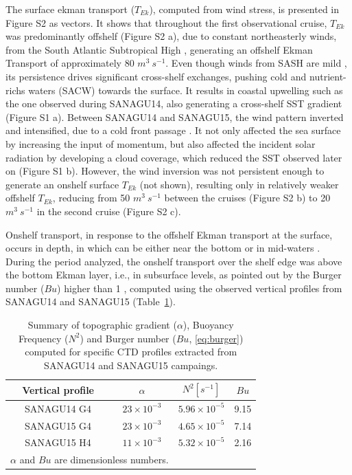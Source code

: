 \documentclass[draft]{agujournal2019}
\begin{document}
The surface ekman transport ($T_{Ek}$), computed from wind stress, is presented in Figure S2 as vectors. It shows that throughout the first observational cruise, $T_{Ek}$ was predominantly offshelf (Figure S2 a), due to constant northeasterly winds, from the South Atlantic Subtropical High \cite<SASH, >{stech1990estudo}, generating an offshelf Ekman Transport of approximately 80 $m^3\ s^{-1}$. Even though winds from SASH are mild \cite{stech1990estudo}, its persistence drives significant cross-shelf exchanges, pushing cold and nutrient-richs waters (SACW) towards the surface. It results in coastal upwelling such as the one observed during SANAGU14, also generating a cross-shelf SST gradient (Figure S1 a). Between SANAGU14 and SANAGU15, the wind pattern inverted and intensified, due to a cold front passage \cite{stech1990estudo}. It not only affected the sea surface by increasing the input of momentum, but also affected the incident solar radiation by developing a cloud coverage, which reduced the SST observed later on (Figure S1 b). However, the wind inversion was not persistent enough to generate an onshelf surface $T_{Ek}$ (not shown), resulting only in relatively weaker offshelf $T_{Ek}$, reducing from 50 $m^3\ s^{-1}$ between the cruises (Figure S2 b) to 20 $m^3\ s^{-1}$ in the second cruise (Figure S2 c).

Onshelf transport, in response to the offshelf Ekman transport at the surface, occurs in depth, in which can be either near the bottom or in mid-waters \cite{LentzChapman2004}. During the period analyzed, the onshelf transport over the shelf edge was above the bottom Ekman layer, i.e., in subsurface levels, as pointed out by the Burger number ($Bu$) higher than 1 \cite{LentzChapman2004}, computed using the observed vertical profiles from SANAGU14 and SANAGU15 (Table~\ref{tab:burger_number}).

\begin{table}[ht!]
\label{tab:burger_number}
\caption{Summary of topographic gradient ($\alpha$), Buoyancy Frequency ($N^2$) and Burger number ($Bu$, \ref{eq:burger}) computed for specific CTD profiles extracted from SANAGU14 and SANAGU15 campaings.}
\centering
\begin{tabular}{c c c c}
\hline
\textbf{Vertical profile} & \textbf{$\alpha$} & \textbf{$N^2 [s^{-1}]$} & \textbf{$Bu$} \\
\hline
        SANAGU14 G4 & $23 \times 10^{-3}$ & $5.96 \times 10^{-5}$ & 9.15 \\
        SANAGU15 G4 & $23 \times 10^{-3}$ & $4.65 \times 10^{-5}$ & 7.14 \\
        SANAGU15 H4 & $11 \times 10^{-3}$ & $5.32 \times 10^{-5}$ & 2.16 \\
\hline
\multicolumn{2}{l}{$\alpha$ and $Bu$ are dimensionless numbers.}
\end{tabular}
\end{table}
\end{document}
